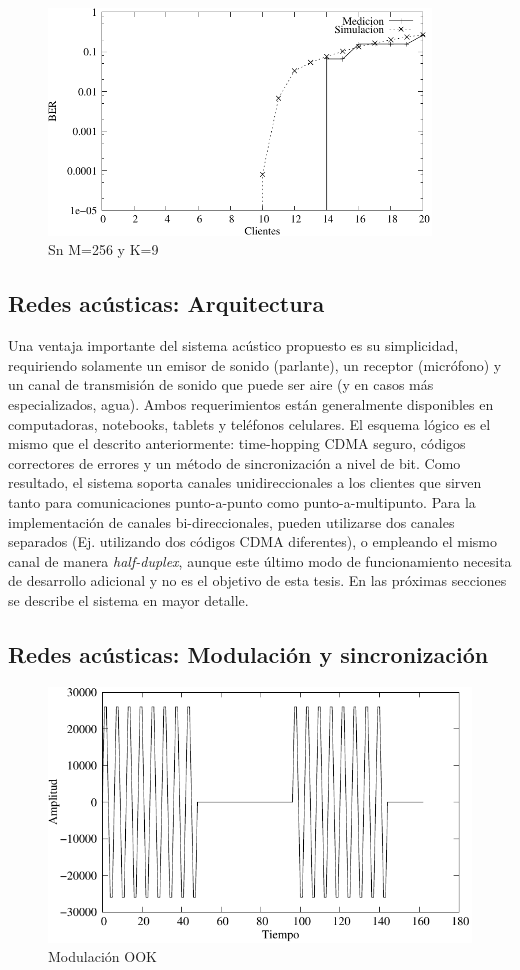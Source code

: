 \begin{figure}[t]
  \centering
    \includegraphics[width=4in]{graphs/audio-fig6}
    \caption{Sn M=256 y K=9}
    \label{arch:AudioSimul}
\end{figure}



\subsection{Redes acústicas: Arquitectura}

Una ventaja importante del sistema acústico propuesto es su simplicidad, requiriendo solamente un emisor de sonido (parlante), un receptor (micrófono) y un canal de transmisión de sonido que puede ser aire (y en casos más especializados, agua). Ambos requerimientos están generalmente disponibles en computadoras, notebooks, tablets y teléfonos celulares. 
El esquema lógico es el mismo que el descrito anteriormente: time-hopping CDMA seguro, códigos correctores de errores y un método de sincronización a nivel de bit.
Como resultado, el sistema soporta canales unidireccionales a los clientes que sirven tanto para comunicaciones punto-a-punto como punto-a-multipunto. 
Para la implementación de canales bi-direccionales, pueden utilizarse dos canales separados (Ej. utilizando dos códigos CDMA diferentes), o empleando el mismo canal de manera \textit{half-duplex}, aunque este último modo de funcionamiento necesita de desarrollo adicional y no es el objetivo de esta tesis.
En las próximas secciones se describe el sistema en mayor detalle.

\subsection{Redes acústicas: Modulación y sincronización}
\begin{figure}[t]
  \centering
    \includegraphics[width=4.5in]{graphs/modulated.pdf}
    \caption{Modulación OOK}
    \label{arch:ook}
\end{figure}


